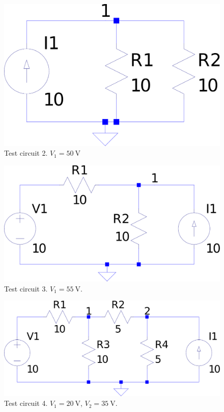 \documentclass[journal,hidelinks]{IEEEtran}
\begin{document}
\begin{figure}[!htb]
  \centering
  \includegraphics[width=\columnwidth,height=0.35\columnwidth,keepaspectratio]{question-1/circuit-2.pdf}
  \caption{Test circuit 2. $V_1 = \SI{50}{\volt}$}
  \label{fig:q1-circuit-2}
\end{figure}

\begin{figure}[!htb]
  \centering
  \includegraphics[width=\columnwidth,height=0.4\columnwidth,keepaspectratio]{question-1/circuit-3.pdf}
  \caption{Test circuit 3. $V_1 = \SI{55}{\volt}$.}
  \label{fig:q1-circuit-3}
\end{figure}

\begin{figure}[!htb]
  \centering
  \includegraphics[width=\columnwidth,height=0.4\columnwidth,keepaspectratio]{question-1/circuit-4.pdf}
  \caption{Test circuit 4. $V_1 = \SI{20}{\volt}$, $V_2 = \SI{35}{\volt}$.}
  \label{fig:q1-circuit-4}
\end{figure}
\end{document}

